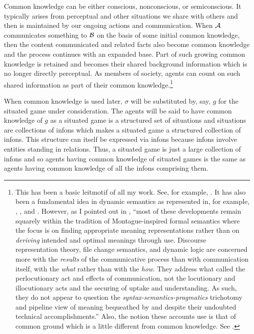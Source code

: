Common knowledge can be either conscious, nonconscious, or semiconscious. It typically arises from perceptual and other situations we share with others and then is maintained by our ongoing actions and communication. When $\cal A$ communicates something to $\cal B$ on the basis of some initial common knowledge, then the content communicated and related facts also become common knowledge and the process continues with an expanded base. Part of such growing common knowledge is retained and becomes their shared background information which is no longer directly perceptual. As members of society, agents can count on such shared information as part of their common knowledge.\footnote{This has been a basic leitmotif of all my work. See, for example, \citet[Section~6.4]{parikh:ul}. It has also been a fundamental idea in dynamic semantics as represented in, for example, \citet{kamp:ttsr}, \citet{heim:diss}, and \citet{gs:dpl}. However, as I pointed out in \citet[5]{parikh:le}, ``most of these developments remain squarely within the tradition of Montague-inspired formal semantics where the focus is on finding appropriate meaning representations rather than on \emph{deriving} intended and optimal meanings through use. Discourse representation theory, file change semantics, and dynamic logic are concerned more with the \emph{results} of the communicative process than with communication itself, with the \emph{what} rather than with the \emph{how}. They address what \citet{austin:pu} called the perlocutionary act and effects of communication, not the locutionary and illocutionary acts and the securing of uptake and understanding. As such, they do not appear to question the \emph{syntax-semantics-pragmatics} trichotomy and pipeline view of meaning bequeathed by \citet{morris:fts} and \citet{grice:sitwow} despite their undoubted technical accomplishments.'' Also, the notion these accounts use is that of common ground which is a little different from common knowledge. See \citet{stalnaker:cg}.}

When common knowledge is used later, $\sigma$ will be substituted by, say, $g$ for the situated game under consideration. The agents will be said to have common knowledge of $g$ as a situated game is a structured set of situations and situations are collections of infons which makes a situated game a structured collection of infons. This structure can itself be expressed via infons because infons involve entities standing in relations. Thus, a situated game is just a large collection of infons and so agents having common knowledge of situated games is the same as agents having common knowledge of all the infons comprising them. 

